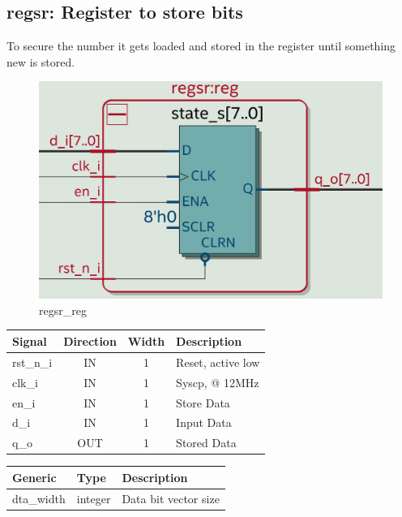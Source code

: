 \documentclass[12pt,a4 paper] {report}
\begin{document}
\subsection{regsr: Register to store bits}
To secure the number it gets loaded and stored in the register until something new is stored.
\begin{figure}[h]
	\centering	
	\includegraphics[scale=0.15]{../png/regsr_reg.png}
	\caption{regsr\_reg}
\end{figure}
\begin{center}
	\begin{tabular}{ | p{2cm} | c | c | p{5cm} |}
		\hline
		\textbf{Signal} & \textbf{Direction} & \textbf{Width} & \textbf{Description} \\
		\hline	
 		rst\_n\_i & IN & 1 & Reset, active low \\
 		\hline
		clk\_i & IN & 1 & Syscp, @ 12MHz \\
		\hline
		en\_i & IN & 1 & Store Data \\
		\hline
		d\_i & IN & 1 & Input Data \\
		\hline
		q\_o & OUT & 1 & Stored Data \\
		\hline
	\end{tabular}
\end{center}
\begin{center}
	\begin{tabular}{| p{2cm} | p{2cm} | p{4cm} |}
	\hline
	\textbf{Generic} & \textbf{Type} & \textbf{Description} \\
	\hline
	dta\_width & integer & Data bit vector size \\
	\hline
	\end{tabular}
\end{center}
\end{document}
